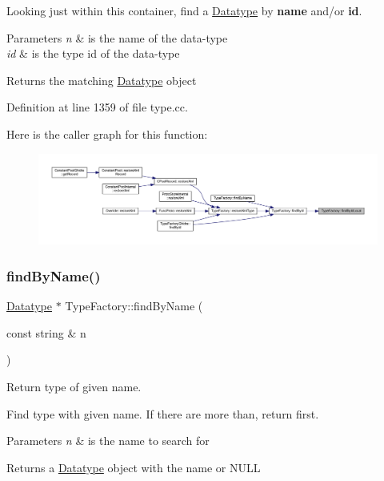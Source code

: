 Looking just within this container, find a \mbox{\hyperlink{class_datatype}{Datatype}} by {\bfseries{name}} and/or {\bfseries{id}}. 
\begin{DoxyParams}{Parameters}
{\em n} & is the name of the data-\/type \\
\hline
{\em id} & is the type id of the data-\/type \\
\hline
\end{DoxyParams}
\begin{DoxyReturn}{Returns}
the matching \mbox{\hyperlink{class_datatype}{Datatype}} object 
\end{DoxyReturn}


Definition at line 1359 of file type.\+cc.

Here is the caller graph for this function\+:
\nopagebreak
\begin{figure}[H]
\begin{center}
\leavevmode
\includegraphics[width=350pt]{class_type_factory_ab86f43d69c0f879d315ce2aacc1f7326_icgraph}
\end{center}
\end{figure}
\mbox{\label{class_type_factory_a5e139f5b338e423fd2b1beb7d941d30f}} 
\subsubsection{\texorpdfstring{findByName()}{findByName()}}
{\footnotesize\ttfamily \mbox{\hyperlink{class_datatype}{Datatype}} $\ast$ Type\+Factory\+::find\+By\+Name (\begin{DoxyParamCaption}\item[{const string \&}]{n }\end{DoxyParamCaption})}



Return type of given name. 

Find type with given name. If there are more than, return first. 
\begin{DoxyParams}{Parameters}
{\em n} & is the name to search for \\
\hline
\end{DoxyParams}
\begin{DoxyReturn}{Returns}
a \mbox{\hyperlink{class_datatype}{Datatype}} object with the name or N\+U\+LL 
\end{DoxyReturn}


